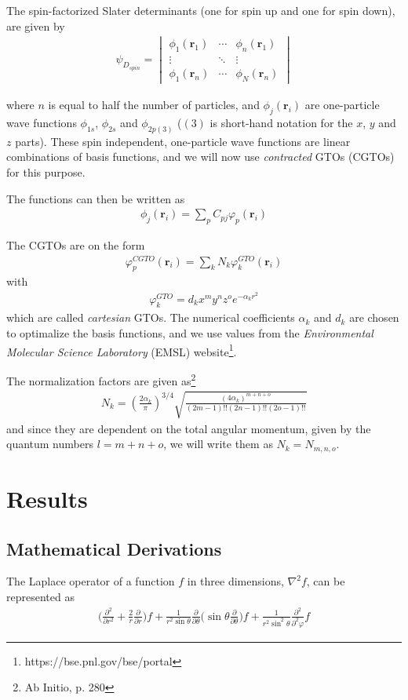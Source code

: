 \documentclass[twocolumns, a4paper,11pt,fleqn]{extarticle}
\newcommand{\eq}[1]{{\small\begin{align*}#1\end{align*}}}
\newcommand{\vmat}[1]{\begin{vmatrix}#1\end{vmatrix}}
\renewcommand\vec[1]{\boldsymbol{\mathbf{#1}}}
\renewcommand{\thesubsection}{\Alph{subsection}.}
\renewcommand{\thesubsubsection}{\roman{subsubsection}.}
\begin{document}
The spin-factorized Slater determinants (one for spin up and one for spin down),
are given by
\eq{\psi_{D_{spin}} = 
  \vmat{\phi_1(\vec r_1)& \cdots & \phi_n(\vec r_1)\\
  \vdots&\ddots&\vdots\\
  \phi_1(\vec r_n)& \cdots & \phi_N(\vec r_n)}
}

where $n$ is equal to half the number of particles, 
and  $\phi_j(\vec r_i)$ are one-particle wave functions 
$\phi_{1s}$, $\phi_{2s}$ and $\phi_{2p(3)}$
($(3)$ is short-hand notation for the $x$, $y$ and $z$ parts).
These spin independent, one-particle wave functions are
linear combinations of basis functions, and we will now use \textit{contracted} GTOs
(CGTOs) for this purpose.

The functions can then be written as
\eq{\phi_j(\vec r_i) = \sum_p C_{pj} \varphi_p(\vec r_i)
}

The CGTOs are on the form
\eq{
  \varphi_p^{CGTO}(\vec r_i) = \sum_k N_k \varphi^{GTO}_k(\vec r_i)
}
with
\eq{
  \varphi^{GTO}_k = d_k x^m y^n z^o e^{-\alpha_k r^2}
}
which are called \textit{cartesian} GTOs. 
The numerical coefficients $\alpha_k$ and $d_k$ are chosen to optimalize the
basis functions, and we use values from the 
\textit{Environmental Molecular Science Laboratory} (EMSL) 
website\footnote{https://bse.pnl.gov/bse/portal}.

The normalization factors are given as\footnote{Ab Initio, p. 280}
\eq{
  N_k = \left(\frac{2\alpha_k}{\pi}\right)^{3/4}
  \sqrt{\frac{(4\alpha_k)^{m+n+o}}{(2m-1)!!(2n-1)!!(2o-1)!!}}
}
and since they are dependent on the total angular momentum,
given by the quantum numbers $l = m+n+o$, we will write them as
$N_k = N_{m,n,o}$.

\section{Results}

\appendix
\renewcommand{\thesubsection}{Appendix \Alph{subsection}:}
\renewcommand{\thesubsubsection}{\arabic{subsubsection}.}

\subsection{Mathematical Derivations}
The Laplace operator of a function $f$ in three dimensions, $\nabla^2 f$,
can be represented as
{\small
\eq{
  \bigg( \frac{\partial^2}{\partial r^2} 
    + \frac{2}{r} \frac{\partial}{\partial r} \bigg) f
    +\frac{1}{r^2 \sin\theta}\frac{\partial}{\partial \theta}
    \bigg( \sin\theta \frac{\partial}{\partial \theta}  \bigg) f
    +\frac{1}{r^2 \sin^2\theta}\frac{\partial^2}{\partial^2 \varphi} f
}}%
\end{document}
